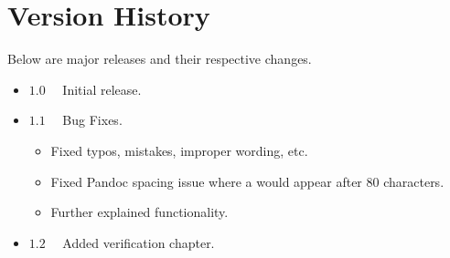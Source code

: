 \chapter{Version History}

Below are major releases and their respective changes.

\hfill

\begin{itemize}
\item $\mathbf{1.0} \quad$ Initial release.
\item $\mathbf{1.1} \quad$ Bug Fixes.
  \begin{itemize}
  \item Fixed typos, mistakes, improper wording, etc.
  \item Fixed Pandoc spacing issue where a  would appear after 80 characters.
  \item Further explained functionality.
  \end{itemize}
\item $\mathbf{1.2} \quad$ Added verification chapter.
\end{itemize}
